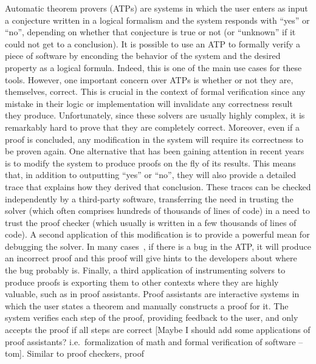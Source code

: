 \documentclass[a4paper, 12pt]{article}
\newcommand{\yell}[1]{{\color{blue} [#1]}}
\newcommand{\tom}[1]{\yell{#1 --tom}}
\begin{document}

Automatic theorem provers (ATPs) are systems in which the user enters as input a conjecture written in
a logical
formalism and the system responds with ``yes'' or ``no'', depending on whether that conjecture is true or
not (or ``unknown'' if it could not get to a conclusion).
It is possible to use an ATP to formally verify a piece of software by enconding the behavior of the system
and the desired property as a logical formula. Indeed, this is one of the main use cases for these tools.
%
However, one important concern over ATPs is whether or not they are, themselves, correct. This is crucial
in the context of formal verification since any mistake in their logic or implementation will invalidate any
correctness result they produce. Unfortunately, since these solvers are usually highly complex,
it is remarkably hard to prove that they are completely correct. Moreover, even if a proof is concluded,
any modification in the system will require its correctness to be proven again. One alternative that has been
gaining attention in recent years~\cite{generatingProofs, proofsInSmt} is to modify the system to produce
proofs on the fly of its results. This means that, in addition to outputting ``yes'' or ``no'', they will
also provide a detailed trace that explains how they derived that conclusion. These traces can be
checked independently by a third-party software, transferring the need in trusting the solver (which often
comprises hundreds of thousands of lines of code) in a need to trust the proof checker (which usually is
written in a few thousands of lines of code).
%
A second application of this modification is to provide a powerful mean for debugging the solver.
In many cases~\cite{generatingProofs}, if there is a bug in the ATP, it will produce an incorrect
proof and this proof will give hints to the developers about where the bug probably is.
%
Finally, a third application of instrumenting solvers to produce proofs is exporting them to
other contexts where they are highly valuable, such as in proof assistants.
%
Proof assistants are interactive systems in which the user states a theorem and manually constructs
a proof for it. The system verifies each step of the proof, providing feedback to the user, and only
accepts the proof if all steps are correct \tom{Maybe I should add some applications of proof assistants?
i.e.~formalization of math and formal verification of software}. Similar to proof checkers, proof
\end{document}
